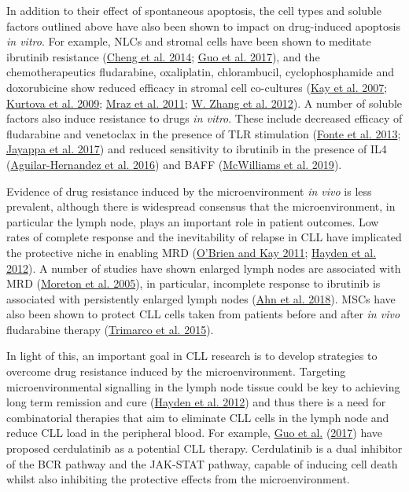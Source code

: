 \documentclass[11pt, a4paper, twosided]{book}
\begin{document}
In addition to their effect of spontaneous apoptosis, the cell types and soluble factors outlined above have also been shown to impact on drug-induced apoptosis \emph{in vitro}. For example, NLCs and stromal cells have been shown to meditate ibrutinib resistance (\protect\hyperlink{ref-Cheng2014}{Cheng et al. 2014}; \protect\hyperlink{ref-Guo2017}{Guo et al. 2017}), and the chemotherapeutics fludarabine, oxaliplatin, chlorambucil, cyclophosphamide and doxorubicine show reduced efficacy in stromal cell co-cultures (\protect\hyperlink{ref-Kay2007}{Kay et al. 2007}; \protect\hyperlink{ref-Kurtova2009}{Kurtova et al. 2009}; \protect\hyperlink{ref-Mraz2011}{Mraz et al. 2011}; \protect\hyperlink{ref-Zhang2012}{W. Zhang et al. 2012}). A number of soluble factors also induce resistance to drugs \emph{in vitro}. These include decreased efficacy of fludarabine and venetoclax in the presence of TLR stimulation (\protect\hyperlink{ref-Fonte2013}{Fonte et al. 2013}; \protect\hyperlink{ref-Jayappa2017}{Jayappa et al. 2017}) and reduced sensitivity to ibrutinib in the presence of IL4 (\protect\hyperlink{ref-AguilarHernandez2016}{Aguilar-Hernandez et al. 2016}) and BAFF (\protect\hyperlink{ref-McWilliams2019}{McWilliams et al. 2019}).

Evidence of drug resistance induced by the microenvironment \emph{in vivo} is less prevalent, although there is widespread consensus that the microenvironment, in particular the lymph node, plays an important role in patient outcomes. Low rates of complete response and the inevitability of relapse in CLL have implicated the protective niche in enabling MRD (\protect\hyperlink{ref-OBrien2011}{O'Brien and Kay 2011}; \protect\hyperlink{ref-Hayden2012}{Hayden et al. 2012}). A number of studies have shown enlarged lymph nodes are associated with MRD (\protect\hyperlink{ref-Moreton2005}{Moreton et al. 2005}), in particular, incomplete response to ibrutinib is associated with persistently enlarged lymph nodes (\protect\hyperlink{ref-Ahn2018}{Ahn et al. 2018}). MSCs have also been shown to protect CLL cells taken from patients before and after \emph{in vivo} fludarabine therapy (\protect\hyperlink{ref-Trimarco2015}{Trimarco et al. 2015}).

In light of this, an important goal in CLL research is to develop strategies to overcome drug resistance induced by the microenvironment. Targeting microenvironmental signalling in the lymph node tissue could be key to achieving long term remission and cure (\protect\hyperlink{ref-Hayden2012}{Hayden et al. 2012}) and thus there is a need for combinatorial therapies that aim to eliminate CLL cells in the lymph node and reduce CLL load in the peripheral blood. For example, \protect\hyperlink{ref-Guo2017}{Guo et al.} (\protect\hyperlink{ref-Guo2017}{2017}) have proposed cerdulatinib as a potential CLL therapy. Cerdulatinib is a dual inhibitor of the BCR pathway and the JAK-STAT pathway, capable of inducing cell death whilst also inhibiting the protective effects from the microenvironment.
\end{document}
